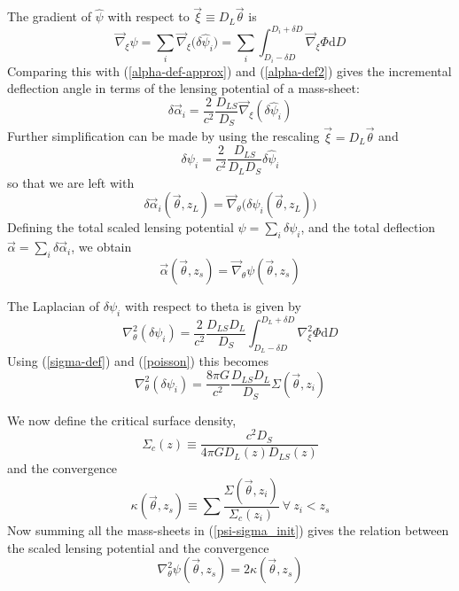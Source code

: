 \documentclass[12pt,preprint]{aastex}			%
\newcommand{\dd}{\mathrm{d}} %
\begin{document}
The gradient of $\hat{\psi}$ with respect to 
$\vec{\xi} \equiv D_L\vec{\theta}$ is
\begin{equation}
  \vec{\nabla}_\xi\hat{\psi} 
  = \sum_i \vec{\nabla}_\xi\big(\delta\hat{\psi}_i\big) 
  = \sum_i \int_{D_i - \delta D}^{D_i+\delta D}\vec{\nabla}_\xi \Phi \dd D
\end{equation}
Comparing this with (\ref{alpha-def-approx}) and (\ref{alpha-def2}) gives the incremental deflection angle in terms of the lensing potential of a mass-sheet:
\begin{equation}
  \delta\vec{\alpha}_i = \frac{2}{c^2}\frac{D_{LS}}{D_S}\vec{\nabla}_\xi (\delta\hat{\psi}_i)
\end{equation}
Further simplification can be made by using the rescaling $\vec{\xi} = D_L \vec{\theta}$ and
\begin{equation}
  \delta\psi_i = \frac{2}{c^2}\frac{D_{LS}}{D_L D_S} \delta\hat{\psi}_i
\end{equation}
so that we are left with
\begin{equation}
  \label{alpha-psi}
  \delta\vec{\alpha}_i(\vec{\theta},z_L) = \vec{\nabla}_\theta \Big( \delta\psi_i(\vec{\theta},z_L)\Big)
\end{equation}
Defining the total scaled lensing potential $\psi = \sum_i \delta\psi_i$, and the total deflection $\vec{\alpha} = \sum_i\delta\vec{\alpha}_i$, we obtain
\begin{equation}
  \vec{\alpha}(\vec{\theta},z_s) = \vec{\nabla}_\theta \psi(\vec{\theta},z_s)
\end{equation}

The Laplacian of $\delta\psi_i$ with respect to theta is given by
\begin{equation}
  \nabla_\theta^2 (\delta\psi_i) 
  = \frac{2}{c^2}\frac{D_{LS}D_L}{D_S}\int_{D_L-\delta D}^{D_L+\delta D} 
  \nabla_\xi^2\Phi \dd D
\end{equation}
Using (\ref{sigma-def}) and (\ref{poisson}) this becomes
\begin{equation}
  \label{psi-sigma_init}
  \nabla_\theta^2(\delta\psi_i) = \frac{8\pi G}{c^2}\frac{D_{LS}D_L}{D_S}\Sigma(\vec{\theta},z_i)
\end{equation}

We now define the critical surface density,
\begin{equation}
  \Sigma_{c}(z) \equiv\frac{c^2 D_S}{4\pi G D_L(z) D_{LS}(z)}
\end{equation}
and the convergence
\begin{equation}
  \label{kappa-sigma}
  \kappa(\vec{\theta},z_s) \equiv \sum \frac{\Sigma(\vec{\theta},z_i)}{\Sigma_c(z_i)}\ \forall\ z_i < z_s
\end{equation}
Now summing all the mass-sheets in (\ref{psi-sigma_init}) gives the relation between the scaled lensing potential and the convergence
\begin{equation}
  \label{psi-kappa-1}
  \nabla_\theta^2\psi(\vec{\theta},z_s) = 2\kappa(\vec{\theta},z_s)
\end{equation}
\end{document}
